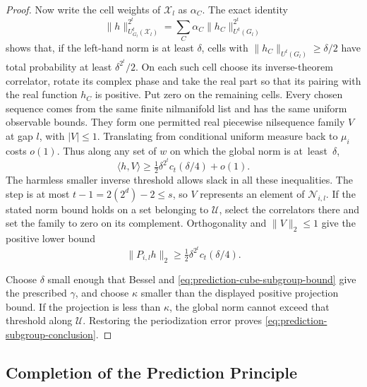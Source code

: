 \begin{proof}
Now write the cell weights of $\mathcal X_l$ as $\alpha_C$.
The exact identity
\[
 \|h\|_{U^t_{G_l}(\mathcal X_l)}^{2^t}
 =\sum_C\alpha_C\|h_C\|_{U^t(G_l)}^{2^t}
\]
shows that, if the left-hand norm is at least $\delta$, cells with
$\|h_C\|_{U^t(G_l)}\geq\delta/2$ have total probability at least
$\delta^{2^t}/2$.  On each such cell choose its inverse-theorem
correlator, rotate its complex phase and take the real part so
that its pairing with the real function $h_C$ is positive.
Put zero on the remaining cells.  Every chosen sequence comes
from the same finite nilmanifold list and has the same uniform
observable bounds.  They form one permitted real piecewise
nilsequence family $V$ at gap $l$, with $|V|\leq1$.  Translating
from conditional uniform measure back to $\mu_i$ costs $o(1)$.
Thus along any set of $w$ on which the global norm is at~least~$\delta$,
\[
 \langle h,V\rangle\geq
 \tfrac12\delta^{2^t}c_t(\delta/4)+o(1).
\]
The harmless smaller inverse threshold allows slack in all these
inequalities.  The step is at most $t-1=2(2^d)-2\leq s$, so
$V$ represents an element of $\mathcal N_{i,l}$.  If the stated
norm bound holds on a set belonging to $\mathcal U$, select the
correlators there and set the family to zero on its complement.
Orthogonality and $\|V\|_2\leq1$ give the positive lower bound
\[
 \|P_{i,l}h\|_2\geq
 \tfrac12\delta^{2^t}c_t(\delta/4).
\]

Choose $\delta$ small enough that Bessel and
\eqref{eq:prediction-cube-subgroup-bound} give the prescribed
$\gamma$, and choose $\kappa$ smaller than the displayed positive
projection bound.  If the projection is less than $\kappa$, the
global norm cannot exceed that threshold along $\mathcal U$.
Restoring the periodization error proves
\eqref{eq:prediction-subgroup-conclusion}.
\end{proof}

\subsection{Completion of the Prediction Principle}

